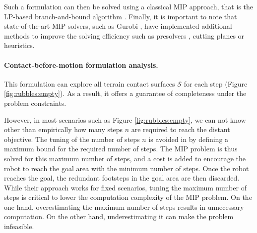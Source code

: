 Such a formulation can then be solved using a classical MIP approach, that is the LP-based branch-and-bound algorithm \cite{gurobi_mip}.
Finally, it is important to note that state-of-the-art MIP solvers, such as Gurobi \cite{gurobi}, have implemented additional methods to improve the solving efficiency such as presolvers \cite{presolve_gurobi_2020}, cutting planes \cite{cutting_plan_gomory_1996} or heuristics. 

\paragraph{Contact-before-motion formulation analysis.}
This formulation can explore all terrain contact surfaces $\mathcal{S}$ for each step (Figure \ref{fig:rubbles:empty}).
As a result, it offers a guarantee of completeness under the problem constraints.

However, in most scenarios such as Figure \ref{fig:rubbles:empty}, we can not know other than empirically how many steps $n$ are required to reach the distant objective.
The tuning of the number of steps $n$ is avoided in \cite{deits2014FootPlanMI} by defining a maximum bound for the required number of steps. The MIP problem is thus solved for this maximum number of steps, and a cost is added to encourage the robot to reach the goal area with the minimum number of steps. 
Once the robot reaches the goal, the redundant footsteps in the goal area are then discarded.
While their approach works for fixed scenarios, tuning the maximum number of steps is critical to lower the computation complexity of the MIP problem. 
On the one hand, overestimating the maximum number of steps results in unnecessary computation. 
On the other hand, underestimating it can make the problem infeasible.

